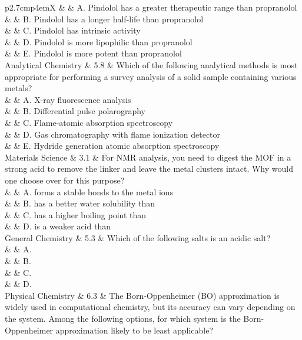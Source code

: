 \begin{xltabular}{\textwidth}{p{2.7cm}p{4em}X}
        & & A. Pindolol has a greater therapeutic range than propranolol \\
        & & B. Pindolol has a longer half-life than propranolol \\
        & & C. Pindolol has intrinsic activity \\
        & & D. Pindolol is more lipophilic than propranolol \\
        & & E. Pindolol is more potent than propranolol \\
        \midrule
        Analytical Chemistry & 5.8 & Which of the following analytical methods is most appropriate for performing a survey analysis of a solid sample containing various metals? \\
        & & A. X-ray fluorescence analysis \\
        & & B. Differential pulse polarography \\
        & & C. Flame-atomic absorption spectroscopy \\
        & & D. Gas chromatography with flame ionization detector \\
        & & E. Hydride generation atomic absorption spectroscopy \\
        \midrule
        Materials Science & 3.1 & For NMR analysis, you need to digest the MOF in a strong acid to remove the linker and leave the metal clusters intact. Why would one choose  over  for this purpose? \\
        & & A.  forms a stable bonds to the metal ions \\
        & & B.  has a better water solubility than  \\
        & & C.  has a higher boiling point than  \\
        & & D.  is a weaker acid than  \\
        \midrule
        General Chemistry & 5.3 & Which of the following salts is an acidic salt? \\
        & & A.  \\
        & & B.  \\
        & & C.  \\
        & & D.  \\
        \midrule
        Physical Chemistry & 6.3 & The Born-Oppenheimer (BO) approximation is widely used in computational chemistry, but its accuracy can vary depending on the system. Among the following options, for which system is the Born-Oppenheimer approximation likely to be least applicable? \\

\end{xltabular}
